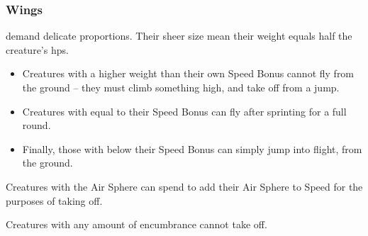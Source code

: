 \begin{multicols}{2}
\subsubsection{Wings}
demand delicate proportions.
Their sheer size mean their \gls{weight} equals half the creature's \glspl{hp}.

\begin{itemize}
  \item
  Creatures with a higher \gls{weight} than their own Speed Bonus cannot fly from the ground -- they must climb something high, and take off from a jump.
  \item
  Creatures with  equal to their Speed Bonus can fly after sprinting for a full round.
  \item
  Finally, those with  below their Speed Bonus can simply jump into flight, from the ground.
\end{itemize}

Creatures with the Air Sphere can spend  to add their Air Sphere to Speed for the purposes of taking off.

Creatures with any amount of encumbrance cannot take off.


\end{multicols}
